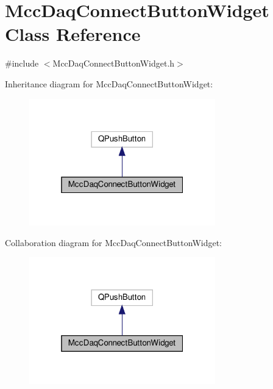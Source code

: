\hypertarget{class_mcc_daq_connect_button_widget}{}\section{Mcc\+Daq\+Connect\+Button\+Widget Class Reference}
\label{class_mcc_daq_connect_button_widget}


{\ttfamily \#include $<$Mcc\+Daq\+Connect\+Button\+Widget.\+h$>$}



Inheritance diagram for Mcc\+Daq\+Connect\+Button\+Widget\+:
\nopagebreak
\begin{figure}[H]
\begin{center}
\leavevmode
\includegraphics[width=229pt]{class_mcc_daq_connect_button_widget__inherit__graph}
\end{center}
\end{figure}


Collaboration diagram for Mcc\+Daq\+Connect\+Button\+Widget\+:
\nopagebreak
\begin{figure}[H]
\begin{center}
\leavevmode
\includegraphics[width=229pt]{class_mcc_daq_connect_button_widget__coll__graph}
\end{center}
\end{figure}
